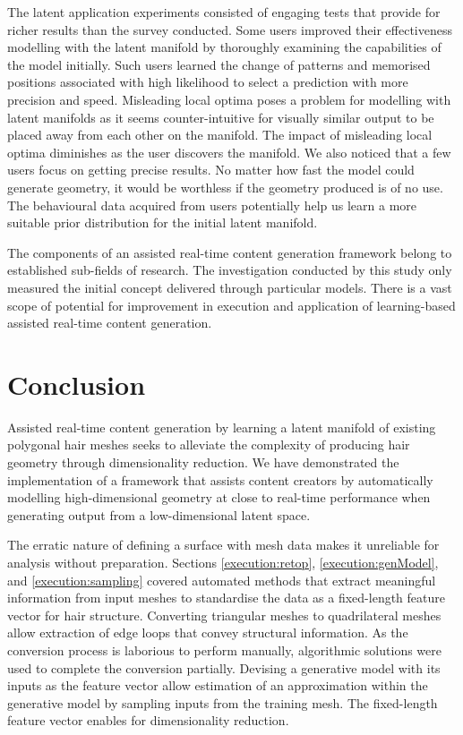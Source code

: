 \documentclass[ %
author={Dillon Keith Diep},
supervisor={Dr. Carl Henrik Ek},
degree={MEng},
title={ART-CG Hair:},
subtitle={Assisted Real-time Content Generation of Stylised Virtual Hair},
type={Research},
year={2017} ]{dissertation}
\begin{document}
The latent application experiments consisted of engaging tests that provide for richer results than the survey conducted. Some users improved their effectiveness modelling with the latent manifold by thoroughly examining the capabilities of the model initially. Such users learned the change of patterns and memorised positions associated with high likelihood to select a prediction with more precision and speed. Misleading local optima poses a problem for modelling with latent manifolds as it seems counter-intuitive for visually similar output to be placed away from each other on the manifold. The impact of misleading local optima diminishes as the user discovers the manifold. We also noticed that a few users focus on getting precise results. No matter how fast the model could generate geometry, it would be worthless if the geometry produced is of no use. The behavioural data acquired from users potentially help us learn a more suitable prior distribution for the initial latent manifold.

The components of an assisted real-time content generation framework belong to established sub-fields of research. The investigation conducted by this study only measured the initial concept delivered through particular models. There is a vast scope of potential for improvement in execution and application of learning-based assisted real-time content generation.


\chapter{Conclusion}
\label{chap:conclusion}
Assisted real-time content generation by learning a latent manifold of existing polygonal hair meshes seeks to alleviate the complexity of producing hair geometry through dimensionality reduction.
We have demonstrated the implementation of a framework that assists content creators by automatically modelling high-dimensional geometry at close to real-time performance when generating output from a low-dimensional latent space.

The erratic nature of defining a surface with mesh data makes it unreliable for analysis without preparation.
Sections \ref{execution:retop}, \ref{execution:genModel}, and \ref{execution:sampling} covered automated methods that extract meaningful information from input meshes to standardise the data as a fixed-length feature vector for hair structure.
Converting triangular meshes to quadrilateral meshes allow extraction of edge loops that convey structural information. As the conversion process is laborious to perform manually, algorithmic solutions were used to complete the conversion partially.
Devising a generative model with its inputs as the feature vector allow estimation of an approximation within the generative model by sampling inputs from the training mesh.
The fixed-length feature vector enables for dimensionality reduction.
\end{document}

